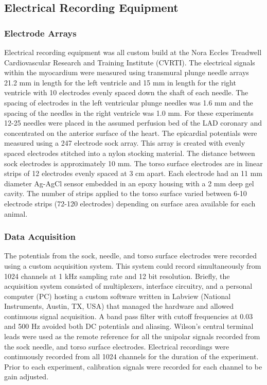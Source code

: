 \documentclass[twocolumn]{cinc}
\begin{document}
\subsection{Electrical Recording Equipment}

\subsubsection{Electrode Arrays}

Electrical recording equipment was all custom build at the Nora Eccles Treadwell Cardiovascular Research and Training Institute (CVRTI). The electrical signals within the myocardium were measured using transmural plunge needle arrays 21.2 mm in length for the left ventricle and 15 mm in length for the right ventricle with 10 electrodes evenly spaced down the shaft of each needle. The spacing of electrodes in the left ventricular plunge needles was 1.6 mm and the spacing of the needles in the right ventricle was 1.0 mm.  For these experiments 12-25 needles were placed in the assumed perfusion bed of the LAD coronary and concentrated on the anterior surface of the heart. The epicardial potentials were measured using a 247 electrode sock array. This array is created with evenly spaced electrodes stitched into a nylon stocking material. The distance between sock electrodes is approximately 10 mm. The torso surface electrodes are in linear strips of 12 electrodes evenly spaced at 3 cm apart. Each electrode had an 11 mm diameter Ag-AgCl sensor embedded in an epoxy housing with a 2 mm deep gel cavity. The number of strips applied to the torso surface varied between 6-10 electrode strips (72-120 electrodes) depending on surface area available for each animal. 

\subsubsection{Data Acquisition}

The potentials from the sock, needle, and torso surface electrodes were recorded using a custom acquisition system. This system could record simultaneously from 1024 channels at 1 kHz sampling rate and 12 bit resolution. Briefly, the acquisition system consisted of multiplexers, interface circuitry, and a personal computer (PC) hosting a custom software written in Labview (National Instruments, Austin, TX, USA) that managed the hardware and allowed continuous signal acquisition. A band pass filter with cutoff frequencies at 0.03 and 500 Hz avoided both DC potentials and aliasing. Wilson's central terminal leads were used as the remote reference for all the unipolar signals recorded from the sock needle, and torso surface electrodes. Electrical recordings were continuously recorded from all 1024 channels for the duration of the experiment. Prior to each experiment, calibration signals were recorded for each channel to be gain adjusted.  
\end{document}
